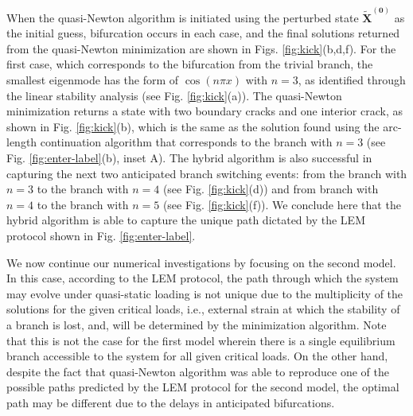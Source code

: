 When the quasi-Newton algorithm is initiated using the perturbed state \(\mathbf{\tilde X^{(0)}}\)
as the initial guess, bifurcation occurs in each case, and the final solutions returned from the quasi-Newton minimization are shown in Figs. \ref{fig:kick}(b,d,f). For the first case, which corresponds to the bifurcation from the trivial branch, the smallest eigenmode has the form of \(\cos(n\pi x)\) with \(n=3\), as identified through the linear stability analysis (see Fig. \ref{fig:kick}(a)). The quasi-Newton minimization returns a state with two boundary cracks and one interior crack, as shown in Fig. \ref{fig:kick}(b), which is the same as the solution found using the arc-length continuation algorithm that corresponds to the branch with \(n=3\) (see Fig. \ref{fig:enter-label}(b), inset A).  The hybrid algorithm is also successful in capturing the next two  anticipated branch   switching events: from the  branch with \(n=3\)  to the branch  with \(n=4\) (see Fig. \ref{fig:kick}(d)) and  from branch with \(n=4\)  to the branch  with \(n=5\) (see Fig. \ref{fig:kick}(f)).   We  conclude here that the hybrid algorithm is able to capture the unique path dictated by the LEM protocol shown in Fig. \ref{fig:enter-label}.   

We now continue our numerical investigations by focusing on the second model. In this case, according to the LEM protocol, the path through which the system may evolve under quasi-static loading is not unique due to the multiplicity of the solutions for  the given critical loads, i.e., external strain at which the stability of a branch is lost,  and, will be determined by the minimization algorithm. Note that this is not the case for the first model wherein there is a single equilibrium branch accessible to the system for all given critical loads. On the other hand, despite the fact that quasi-Newton algorithm was able to reproduce one of the possible paths predicted by the LEM protocol for the second model, the optimal path  may be different due to the delays in anticipated bifurcations. 


